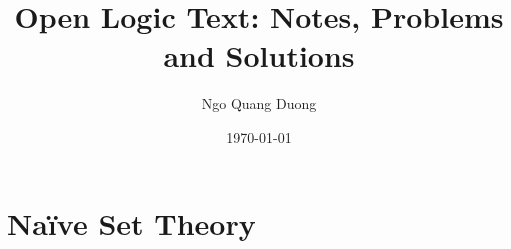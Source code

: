 \documentclass{open-logic-text}
\title{Open Logic Text: Notes, Problems and Solutions}
\author{Ngo Quang Duong}
\date{\today}
\begin{document}
\maketitle

\part{Na{\"i}ve Set Theory}







\end{document}
